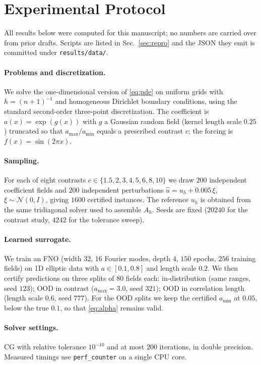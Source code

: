 \documentclass[journal]{IEEEtran}
\theoremstyle{plain}
\theoremstyle{definition}
\begin{document}
\section{Experimental Protocol}
All results below were computed for this manuscript; no numbers are carried over from
prior drafts. Scripts are listed in Sec.~\ref{sec:repro} and the JSON they emit is
committed under \texttt{results/data/}.

\paragraph{Problems and discretization.} We solve the one-dimensional
version of \eqref{eq:pde} on uniform grids with $h=(n+1)^{-1}$ and homogeneous Dirichlet
boundary conditions, using the standard second-order three-point discretization. The
coefficient is $a(x)=\exp(g(x))$ with $g$ a Gaussian random field (kernel length scale
$0.25$) truncated so that $a_{\max}/a_{\min}$ equals a prescribed contrast $c$; the
forcing is $f(x)=\sin(2\pi x)$.

\paragraph{Sampling.} For each of eight contrasts
$c\in\{1.5,2,3,4,5,6,8,10\}$ we draw $200$ independent coefficient fields and $200$
independent perturbations $\hat u=u_h+0.005\,\xi$, $\xi\sim\mathcal N(0,I)$, giving
$1600$ certified instances. The reference $u_h$ is obtained from the same tridiagonal
solver used to assemble $A_h$. Seeds are fixed ($20240$ for the contrast study, $4242$
for the tolerance sweep).

\paragraph{Learned surrogate.} We train an FNO (width $32$, $16$ Fourier modes,
depth $4$, $150$ epochs, $256$ training fields) on 1D elliptic data with
$a\in[0.1,0.8]$ and length scale $0.2$. We then certify predictions on three splits of
$80$ fields each: in-distribution (same ranges, seed $123$); OOD in contrast
($a_{\max}=3.0$, seed $321$); OOD in correlation length (length scale $0.6$, seed
$777$). For the OOD splits we keep the certified $a_{\min}$ at $0.05$, below the true
$0.1$, so that \eqref{eq:alpha} remains valid.

\paragraph{Solver settings.} CG with relative tolerance $10^{-10}$ and at most $200$
iterations, in double precision. Measured timings use \texttt{perf\_counter} on a single
CPU core.
\end{document}

